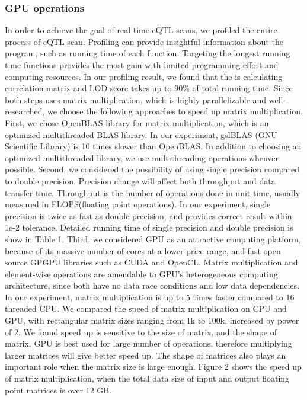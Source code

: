 \documentclass[9pt,twocolumn,twoside,lineno]{gsag3jnl}
\begin{document}
\subsubsection{GPU operations}
\iffalse
	In order to achieve the goal of real time eQTL scans, we profiled the entire process of eQTL scan. Profiling can provide insightful information about the program,  such as running time of each function. 
	Targeting the longest running time functions provides the most gain with limited programming effort and computing resources. 
	In our profiling result, we found that the is calculating correlation matrix and LOD score takes up to 90\% of total running time. 
	Since both steps uses matrix multiplication, which is highly parallelizable and well-researched, we choose the following approaches to speed up matrix multiplication. 
	First, we chose OpenBLAS library for matrix multiplication, which is an optimized  multithreaded BLAS library. 
	In our experiment, gslBLAS (GNU Scientific Library) is 10 times slower than OpenBLAS. 
	In addition to choosing an optimized multithreaded library, we use multithreading operations whenver possible.
	Second, we considered the possibility of using single precision compared to double precision. 
	Precision change will affect both throughput and data transfer time. 
	Throughput is the number of operations done in unit time, usually measured in FLOPS(floating point operations).
	In our experiment, single precision is twice as fast as double precision, and provides correct result within 1e-2 tolerance. 
	Detailed running time of single precision and double precision is show in Table 1. 
	Third, we considered GPU as an attractive computing platform, because of its massive number of cores at a lower price range, and fast open source GPGPU libraries such as CUDA and OpenCL. 
	Matrix multiplication and element-wise operations are amendable to GPU's heterogeneous computing architecture, since both have no data race conditions and low data dependencies. 
	In our experiment, matrix multiplication is up to 5 times faster compared to 16 threaded CPU. 
	We compared the speed of matrix multiplication on CPU and GPU, with rectangular matrix sizes ranging from 1k to 100k, increased by power of 2, 
	We found speed up is sensitive to the size of matrix, and the shape of matrix.  
	GPU is best used for large number of operations, therefore multiplying larger matrices will give better speed up. 
	The shape of matrices also plays an important role when the matrix size is large enough. 
	Figure 2 shows the speed up of matrix multiplication, when the total data size of input and output floating point matrices is over 12 GB. 
\end{document}
